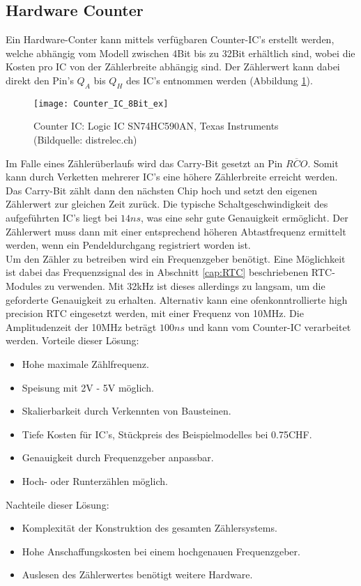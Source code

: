 	\subsection{Hardware Counter}
		Ein Hardware-Conter kann mittels verfügbaren Counter-IC's erstellt werden, welche abhängig vom Modell zwischen 4Bit bis zu 32Bit erhältlich sind, wobei die Kosten pro IC von der Zählerbreite abhängig sind. Der Zählerwert kann dabei direkt den Pin's $Q_A$ bis $Q_H$ des IC's entnommen werden (Abbildung \ref{fig:SN74HC590AN}).
		\begin{figure}[H]
        	\centering
        	\texttt{[image: Counter\_IC\_8Bit\_ex]}
        	\caption{Counter IC: Logic IC SN74HC590AN, Texas Instruments (Bildquelle: distrelec.ch)}
        	\label{fig:SN74HC590AN}
    	\end{figure}
    Im Falle eines Zählerüberlaufs wird das Carry-Bit gesetzt an Pin $\overline{RCO}$. Somit kann durch Verketten mehrerer IC's eine höhere Zählerbreite erreicht werden. Das Carry-Bit zählt dann den nächsten Chip hoch und setzt den eigenen Zählerwert zur gleichen Zeit zurück. Die typische Schaltgeschwindigkeit des aufgeführten IC's liegt bei $14ns$, was eine sehr gute Genauigkeit ermöglicht. Der Zählerwert muss dann mit einer entsprechend höheren Abtastfrequenz ermittelt werden, wenn ein Pendeldurchgang registriert worden ist.\\
Um den Zähler zu betreiben wird ein Frequenzgeber benötigt. Eine Möglichkeit ist dabei das Frequenzsignal des in Abschnitt \ref{cap:RTC} beschriebenen RTC-Modules zu verwenden. Mit 32kHz ist dieses allerdings zu langsam, um die geforderte Genauigkeit zu erhalten. Alternativ kann eine ofenkonntrollierte high precision RTC eingesetzt werden, mit einer Frequenz von 10MHz. Die Amplitudenzeit der 10MHz beträgt $100ns$ und kann vom Counter-IC verarbeitet werden.
    Vorteile dieser Lösung:
    \begin{itemize}
    	\item Hohe maximale Zählfrequenz.
    	\item Speisung mit 2V - 5V möglich.
    	\item Skalierbarkeit durch Verkennten von Bausteinen.
    	\item Tiefe Kosten für IC's, Stückpreis des Beispielmodelles bei 0.75CHF.
    	\item Genauigkeit durch Frequenzgeber anpassbar.
    	\item Hoch- oder Runterzählen möglich.
    \end{itemize}
    Nachteile dieser Lösung:
    \begin{itemize}
    	\item Komplexität der Konstruktion des gesamten Zählersystems.
    	\item Hohe Anschaffungskosten bei einem hochgenauen Frequenzgeber.
    	\item Auslesen des Zählerwertes benötigt weitere Hardware.
    \end{itemize}
